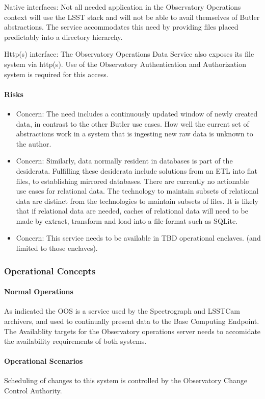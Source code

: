 Native interfaces: Not all needed application in the Observatory Operations context
will use the LSST stack and will not be able to avail themselves of Butler abstractions.
The service accommodates this need by providing files placed predictably into a
directory hierarchy.

Http(s) interface: The Observatory Operations Data Service also exposes its
file system via http(s). Use of the Observatory Authentication and Authorization
system is required for this access.

\paragraph{Risks}

\begin{itemize}

\item Concern: The need includes a continuously updated window of newly created
data, in contrast to the other Butler use cases.  How well the current set of
abstractions work in a system that is ingesting new raw data  is unknown to the
author.

\item Concern: Similarly, data normally resident in databases is part of the desiderata.
Fulfilling these desiderata include solutions from an ETL into flat files, to
establishing mirrored databases. There are currently no actionable use cases
for relational data. The technology to maintain subsets of relational data are distinct
from the technologies to maintain subsets of files. It is likely that if relational data are
needed, caches of relational data will need to be made by extract, transform and load
into a file-format such as SQLite.

\item Concern: This service needs to be available in TBD operational enclaves. (and limited to those enclaves).

\end{itemize}

\subsubsection{Operational Concepts}

\paragraph{Normal Operations}

As indicated the OOS is a service used by the Spectrograph and LSSTCam archivers, and used
to continually present data to the Base Computing Endpoint. The Availablity targets for the
Observatory operations server needs to accomidate the availability requirements of both systems.

\paragraph{Operational Scenarios}

Scheduling of changes to this system is controlled by the Observatory Change Control Authority.
